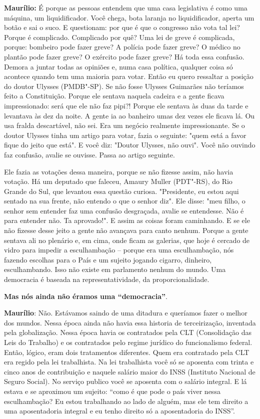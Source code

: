 \textbf{Maurílio:} É porque as pessoas entendem que uma casa legislativa
é como uma máquina, um liquidificador. Você chega, bota laranja no
liquidificador, aperta um botão e sai o suco. E questionam: por que é
que o congresso não vota tal lei? Porque é complicado. Complicado por
quê? Uma lei de greve é complicada, porque: bombeiro pode fazer greve? A
polícia pode fazer greve? O médico no plantão pode fazer greve? O
exército pode fazer greve? Há toda essa confusão. Demora a juntar todas
as opiniões e, numa casa política, qualquer coisa só acontece quando tem
uma maioria para votar. Então eu quero ressaltar a posição do doutor
Ulysses (PMDB"-SP). Se não fosse Ulysses Guimarães não teríamos feito a
Constituição. Porque ele sentava naquela cadeira e a gente ficava
impressionado: será que ele não faz pipi?! Porque ele sentava às duas da
tarde e levantava às dez da noite. A gente ia ao banheiro umas dez vezes
ele ficava lá. Ou usa fralda descartável, não sei. Era um negócio
realmente impressionante. Se o doutor Ulysses tinha um artigo para
votar, fazia o seguinte: "quem está a favor fique do jeito que está". E
você diz: "Doutor Ulysses, não ouvi". Você não ouvindo faz confusão,
avalie se ouvisse. Passa ao artigo seguinte.

Ele fazia as votações dessa maneira, porque se não fizesse assim, não
havia votação. Há um deputado que faleceu, Amaury Muller (PDT"-RS), do
Rio Grande do Sul, que levantou essa questão curiosa. "Presidente, eu
estou aqui sentado na sua frente, não entendo o que o senhor diz". Ele
disse: "meu filho, o senhor sem entender faz uma confusão desgraçada,
avalie se entendesse. Não é para entender não. Ta aprovado!". E assim as
coisas foram caminhando. E se ele não fizesse desse jeito a gente não
avançava para canto nenhum. Porque a gente sentava ali no plenário e, em
cima, onde ficam as galerias, que hoje é cercado de vidro para impedir a
esculhambação -- porque era uma esculhambação, nós fazendo escolhas para
o País e um sujeito jogando cigarro, dinheiro, esculhambando. Isso não
existe em parlamento nenhum do mundo. Uma democracia é baseada na
representatividade, da proporcionalidade.

\textbf{Mas nós ainda não éramos uma ``democracia''}.

\textbf{Maurílio}: Não. Estávamos saindo de uma ditadura e queríamos
fazer o melhor dos mundos. Nessa época ainda não havia essa historia de
terceirização, inventada pela globalização. Nessa época havia os
contratados pela CLT (Consolidação das Leis do Trabalho) e os
contratados pelo regime jurídico do funcionalismo federal. Então,
lógico, eram dois tratamentos diferentes. Quem era contratado pela CLT
era regido pela lei trabalhista. Na lei trabalhista você só se aposenta
com trinta e cinco anos de contribuição e naquele salário maior do INSS
(Instituto Nacional de Seguro Social). No serviço publico você se
aposenta com o salário integral. E lá estava e se aproximou um sujeito:
``como é que pode o país viver nessa esculhambação? Eu estou trabalhando
ao lado de alguém, mas ele tem direito a uma aposentadoria integral e eu
tenho direito só a aposentadoria do INSS''.


